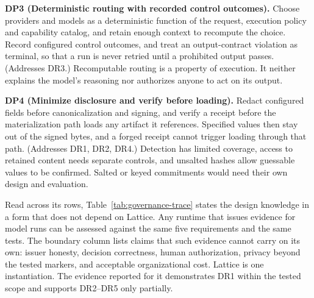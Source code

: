 \documentclass[11pt]{article}
\begin{document}
\textbf{DP3 (Deterministic routing with recorded control outcomes).} Choose providers and models as a deterministic function of the request, execution policy and capability catalog, and retain enough context to recompute the choice. Record configured control outcomes, and treat an output-contract violation as terminal, so that a run is never retried until a prohibited output passes. (Addresses DR3.) Recomputable routing is a property of execution. It neither explains the model's reasoning nor authorizes anyone to act on its output.

\textbf{DP4 (Minimize disclosure and verify before loading).} Redact configured fields before canonicalization and signing, and verify a receipt before the materialization path loads any artifact it references. Specified values then stay out of the signed bytes, and a forged receipt cannot trigger loading through that path. (Addresses DR1, DR2, DR4.) Detection has limited coverage, access to retained content needs separate controls, and unsalted hashes allow guessable values to be confirmed. Salted or keyed commitments would need their own design and evaluation.

Read across its rows, Table~\ref{tab:governance-trace} states the design knowledge in a form that does not depend on Lattice. Any runtime that issues evidence for model runs can be assessed against the same five requirements and the same tests. The boundary column lists claims that such evidence cannot carry on its own: issuer honesty, decision correctness, human authorization, privacy beyond the tested markers, and acceptable organizational cost. Lattice is one instantiation. The evidence reported for it demonstrates DR1 within the tested scope and supports DR2--DR5 only partially.
\end{document}
